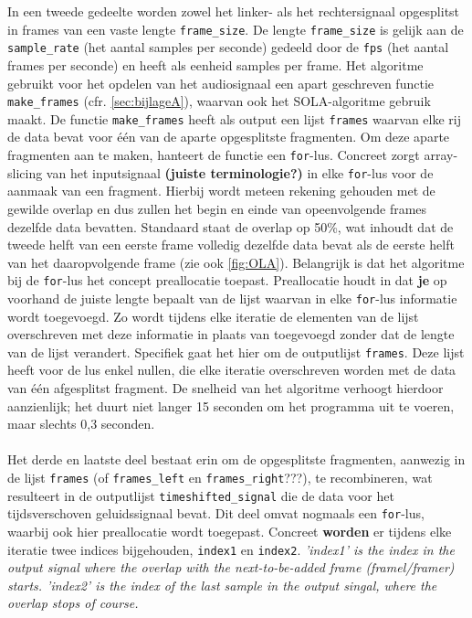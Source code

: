 \documentclass[12pt]{report}
\begin{document}
In een tweede gedeelte worden zowel het linker- als het rechtersignaal opgesplitst in frames van een vaste lengte \verb+frame_size+. De lengte \verb+frame_size+ is gelijk aan de \verb+sample_rate+ (het aantal samples per seconde) gedeeld door de \verb+fps+ (het aantal frames per seconde) en heeft als eenheid samples per frame. Het algoritme gebruikt voor het opdelen van het audiosignaal een apart geschreven functie \verb+make_frames+ (cfr. \cref{sec:bijlageA}), waarvan ook het SOLA-algoritme gebruik maakt. De functie \verb+make_frames+ heeft als output een lijst \verb+frames+ waarvan elke rij de data bevat voor \'e\'en van de aparte opgesplitste fragmenten. Om deze aparte fragmenten aan te maken, hanteert de functie een \verb+for+-lus. Concreet zorgt array-slicing van het inputsignaal \textbf{(juiste terminologie?)} in elke \verb+for+-lus voor de aanmaak van een fragment.  Hierbij wordt meteen rekening gehouden met de gewilde overlap en dus zullen het begin en einde van opeenvolgende frames dezelfde data bevatten. Standaard staat de overlap op 50\%, wat inhoudt dat de tweede helft van een eerste frame volledig dezelfde data bevat als de eerste helft van het daaropvolgende frame (zie ook \cref{fig:OLA}). Belangrijk is dat het algoritme bij de \verb+for+-lus het concept preallocatie toepast.
Preallocatie houdt in dat \textbf{je} op voorhand de juiste lengte bepaalt van de lijst waarvan in elke \verb+for+-lus informatie wordt toegevoegd. Zo wordt tijdens elke iteratie de elementen van de lijst overschreven met deze informatie in plaats van toegevoegd zonder dat de lengte van de lijst verandert. Specifiek gaat het hier om de outputlijst \verb+frames+. Deze lijst heeft voor de lus enkel nullen, die elke iteratie overschreven worden met de data van \'e\'en afgesplitst fragment. De snelheid van het algoritme verhoogt hierdoor aanzienlijk; het duurt niet langer 15 seconden om het programma uit te voeren, maar slechts 0,3 seconden.\\
\\
Het derde en laatste deel bestaat erin om de opgesplitste fragmenten, aanwezig in de lijst \verb+frames+ (of \verb+frames_left+ en \verb+frames_right+???), te recombineren, wat resulteert in de outputlijst \verb+timeshifted_signal+ die de data voor het tijdsverschoven geluidssignaal bevat. Dit deel omvat nogmaals een \verb+for+-lus, waarbij ook hier preallocatie wordt toegepast. Concreet \textbf{worden} er tijdens elke iteratie twee indices bijgehouden, \verb+index1+ en \verb+index2+. 
\textit{ 'index1' is the index in the output signal where the overlap with the next-to-be-added frame (framel/framer) starts.
 'index2' is the index of the last sample in the output singal, where the overlap stops of course.}
\end{document}
